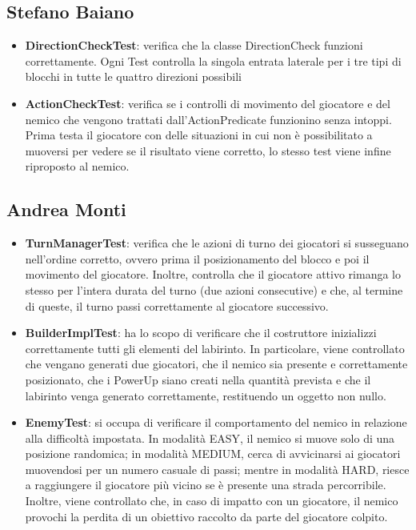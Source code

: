 \documentclass[a4paper,12pt]{report}
\begin{document}
\subsection{Stefano Baiano}
\begin{itemize}
	\item \textbf{DirectionCheckTest}: verifica che la classe DirectionCheck funzioni correttamente. Ogni Test controlla la singola 
	entrata laterale per i tre tipi di blocchi in tutte le quattro direzioni possibili
	\item \textbf{ActionCheckTest}: verifica se i controlli di movimento del giocatore e del nemico che vengono trattati dall'ActionPredicate
	funzionino senza intoppi. Prima testa il giocatore con delle situazioni in cui non è possibilitato a muoversi per vedere se il risultato 
	viene corretto, lo stesso test viene infine riproposto al nemico.
\end{itemize}

\newpage
\subsection{Andrea Monti}
\begin{itemize}
	\item \textbf{TurnManagerTest}: verifica che le azioni di turno dei giocatori si susseguano nell’ordine corretto, 
	ovvero prima il posizionamento del blocco e poi il movimento del giocatore. 
	Inoltre, controlla che il giocatore attivo rimanga lo stesso per l’intera durata del turno (due azioni consecutive) e 
	che, al termine di queste, il turno passi correttamente al giocatore successivo.
	\item \textbf{BuilderImplTest}: ha lo scopo di verificare che il costruttore inizializzi correttamente 
	tutti gli elementi del labirinto. In particolare, viene controllato che vengano generati due giocatori, che il nemico 
	sia presente e correttamente posizionato, che i PowerUp siano creati nella quantità prevista e che il labirinto venga 
	generato correttamente, restituendo un oggetto non nullo.
	\item \textbf{EnemyTest}: si occupa di verificare il comportamento del nemico in relazione alla difficoltà impostata. In modalità
	EASY, il nemico si muove solo di una posizione randomica; in modalità MEDIUM, cerca di avvicinarsi ai 
	giocatori muovendosi per un numero casuale di passi; mentre in modalità HARD, riesce a raggiungere il giocatore più vicino se è 
	presente una strada percorribile. Inoltre, viene controllato che, in caso di impatto con un giocatore, il nemico provochi 
	la perdita di un obiettivo raccolto da parte del giocatore colpito.
\end{itemize}
\end{document}
